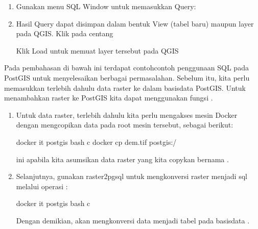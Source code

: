 \documentclass[letterpaper,10pt,english]{sphinxmanual}
\begin{document}
\begin{enumerate}
\item {} 
Gunakan menu SQL Window untuk memasukkan Query:


\item {} 
Hasil Query dapat disimpan dalam bentuk View (tabel baru) maupun layer pada QGIS. Klik pada centang 

Klik Load untuk memuat layer tersebut pada QGIS

\end{enumerate}

Pada pembahasan di bawah ini terdapat contoh\sphinxhyphen{}contoh penggunaan SQL pada PostGIS untuk menyelesaikan berbagai permasalahan. Sebelum itu, kita perlu memasukkan terlebih dahulu data raster ke dalam basisdata PostGIS. Untuk menambahkan raster ke PostGIS kita dapat menggunakan fungsi .
\begin{enumerate}
%
\item {} 
Untuk data raster, terlebih dahulu kita perlu mengakses mesin Docker dengan mengcopikan data pada root mesin tersebut, sebagai berikut:

\begin{sphinxVerbatim}[commandchars=\\\{\}]
docker  \PYGZhy{}it postgis bash \PYGZhy{}c 
docker cp dem.tif postgis:/
\end{sphinxVerbatim}

ini apabila kita asumsikan data raster yang kita copykan bernama .

\item {} 
Selanjutnya, gunakan raster2pgsql untuk mengkonversi raster menjadi sql melalui operasi :

\begin{sphinxVerbatim}[commandchars=\\\{\}]
docker  \PYGZhy{}it postgis bash \PYGZhy{}c 
\end{sphinxVerbatim}

Dengan demikian,  akan mengkonversi data  menjadi tabel  pada basisdata .

\end{enumerate}
\end{document}
